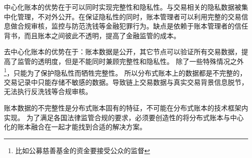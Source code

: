 中心化账本的优势在于可以同时实现完整性和隐私性。与交易相关的隐私数据被集中化管理，不对外公开。在保证隐私性的同时，账本管理者可以利用完整的交易信息做合规审核，监控与防范洗钱等金融犯罪行为。缺点是依赖于账本管理者的信任背书，而且账本之间彼此不透明，提高了金融监管的成本。

去中心化账本的优势在于：账本数据是公开，其它节点可以验证所有交易数据，提高了监管的透明度，但是不能同时兼顾完整性和隐私性。
除了一些特殊情况之外\footnote{比如公募慈善基金的资金要接受公众的监督}，只能为了保护隐私性而牺牲完整性。
所以分布式账本上的数据都是不完整的，交易记录中只能存储不敏感的数据。导致链上交易数据与真实交易背景信息脱节，无法执行反洗钱等合规审核。

账本数据的不完整性是分布式账本固有的特征，不可能在分布式账本的技术框架内实现。
为了满足各国法律监管合规的要求，必须要创造性的将分布式账本与中心化的账本融合在一起才能找到合适的解决方案。

%
